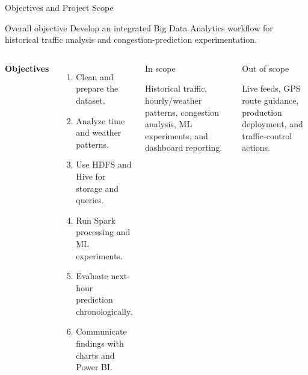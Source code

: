 \documentclass[aspectratio=169,11pt]{beamer}
\begin{document}
\begin{frame}{Objectives and Project Scope}
\begin{block}{Overall objective}
Develop an integrated Big Data Analytics workflow for historical traffic analysis and congestion-prediction experimentation.
\end{block}
\begin{columns}[T,onlytextwidth]
\textbf{Objectives}
\begin{enumerate}
\item Clean and prepare the dataset.
\item Analyze time and weather patterns.
\item Use HDFS and Hive for storage and queries.
\item Run Spark processing and ML experiments.
\item Evaluate next-hour prediction chronologically.
\item Communicate findings with charts and Power BI.
\end{enumerate}
\small
\begin{block}{In scope}
\raggedright
Historical traffic, hourly/weather patterns, congestion analysis, ML experiments, and dashboard reporting.
\end{block}
\vspace{-2mm}
\begin{alertblock}{Out of scope}
\raggedright
Live feeds, GPS route guidance, production deployment, and traffic-control actions.
\end{alertblock}
\end{columns}
\end{frame}
\end{document}
